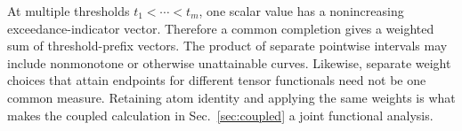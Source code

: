 At multiple thresholds $t_1<\cdots<t_m$, one scalar value has a nonincreasing exceedance-indicator vector. Therefore a common completion gives a weighted sum of threshold-prefix vectors. The product of separate pointwise intervals may include nonmonotone or otherwise unattainable curves. Likewise, separate weight choices that attain endpoints for different tensor functionals need not be one common measure. Retaining atom identity and applying the same weights is what makes the coupled calculation in Sec.~\ref{sec:coupled} a joint functional analysis.
